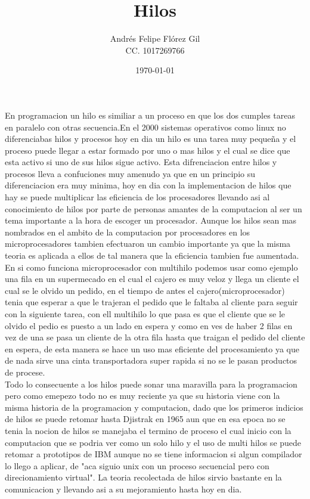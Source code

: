 \documentclass[a4paper]{article}
\title{Hilos}
\author{Andrés Felipe Flórez Gil \\ CC. 1017269766}
\date{\today}
\begin{document}
\maketitle
En programacion un hilo es similiar a un proceso en que los dos cumples tareas  en paralelo con otras secuencia.En el 2000 sistemas operativos como linux no diferenciabas hilos y procesos hoy en dia un hilo es una tarea muy pequeña y el proceso puede llegar a estar formado por uno o mas hilos y el cual se dice que esta activo si uno de sus hilos sigue activo. Esta difrenciacion entre hilos y procesos lleva a confuciones muy amenudo ya que en un principio su diferenciacion era muy minima, hoy en dia con la implementacion de hilos que hay se puede multiplicar las eficiencia de los procesadores llevando asi al conocimiento de hilos por parte de personas amantes de la computacion al ser un tema importante a la hora de escoger un procesador. Aunque los hilos sean mas nombrados en el ambito de la computacion por procesadores en los microprocesadores tambien efectuaron un cambio importante ya que la misma teoria es aplicada a ellos de tal manera que la eficiencia tambien fue aumentada.\\

En si como funciona microprocesador con multihilo podemos usar como ejemplo una fila en un supermecado en el cual el cajero es muy veloz y llega un cliente el cual se le olvido un pedido, en el tiempo de antes el cajero(microprocesador) tenia que esperar a que le trajeran el pedido que le faltaba al cliente para seguir con la siguiente tarea, con ell multihilo lo que pasa es que el cliente que se le olvido el pedio es puesto a un lado en espera y como en ves de haber 2 filas en vez de una se pasa un cliente de la otra fila hasta que traigan el pedido del cliente en espera, de esta manera se hace un uso mas eficiente del procesamiento ya que de nada sirve una cinta transportadora super rapida si no se le pasan productos de procese.\\

Todo lo consecuente a los hilos puede sonar una maravilla para la programacion  pero como emepezo todo no es muy reciente ya que su historia viene con la misma historia de la programacion y computacion, dado que los primeros indicios de hilos se puede retomar hasta Djistrak en 1965 aun que en esa epoca no se tenia la nocion de hilos se manejaba el termino de proceso el cual inicio con la computacion que se podria ver como un solo hilo y el uso de multi hilos se puede retomar a prototipos de IBM aunque no se tiene informacion si algun compilador lo llego a aplicar, de "aca siguio unix con un proceso secuencial pero con direcionamiento virtual". La teoria recolectada de hilos sirvio bastante en la comunicacion y llevando asi a su mejoramiento hasta hoy en dia.\\
\\\\
\end{document}
